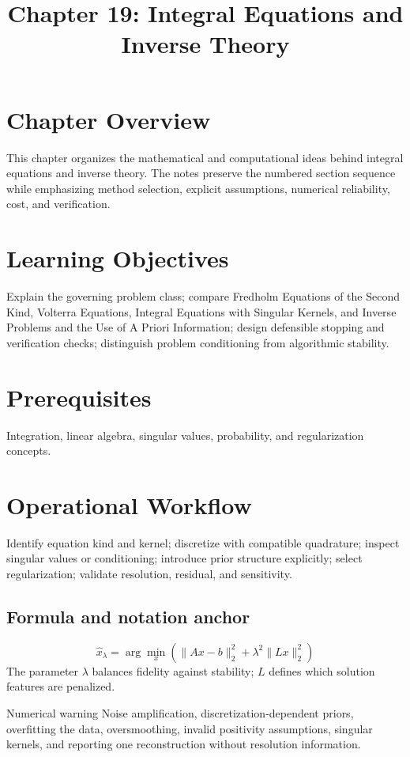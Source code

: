 \documentclass[10pt,letterpaper]{article}
\title{Chapter 19: Integral Equations and Inverse Theory}
\author{}
\date{}
\begin{document}
\maketitle

\section*{Chapter Overview}
This chapter organizes the mathematical and computational ideas behind integral equations and inverse theory. The notes preserve the numbered section sequence while emphasizing method selection, explicit assumptions, numerical reliability, cost, and verification.

\section*{Learning Objectives}
Explain the governing problem class; compare Fredholm Equations of the Second Kind, Volterra Equations, Integral Equations with Singular Kernels, and Inverse Problems and the Use of A Priori Information; design defensible stopping and verification checks; distinguish problem conditioning from algorithmic stability.

\section*{Prerequisites}
Integration, linear algebra, singular values, probability, and regularization concepts.

\section*{Operational Workflow}
Identify equation kind and kernel; discretize with compatible quadrature; inspect singular values or conditioning; introduce prior structure explicitly; select regularization; validate resolution, residual, and sensitivity.

\subsection*{Formula and notation anchor}
\[
\widehat{x}_\lambda=\arg\min_x\left(\|Ax-b\|_2^2+\lambda^2\|Lx\|_2^2\right)
\]
The parameter $\lambda$ balances fidelity against stability; $L$ defines which solution features are penalized.

\begin{warnbox}{Numerical warning}
Noise amplification, discretization-dependent priors, overfitting the data, oversmoothing, invalid positivity assumptions, singular kernels, and reporting one reconstruction without resolution information.
\end{warnbox}
\end{document}
